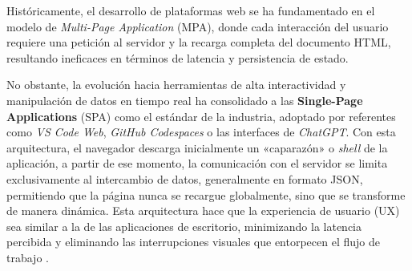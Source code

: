 Históricamente, el desarrollo de plataformas web se ha fundamentado en el modelo de \textit{Multi-Page Application} (MPA), donde cada interacción del usuario requiere una petición al servidor y la recarga completa del documento HTML, resultando ineficaces en términos de latencia y persistencia de estado.

No obstante, la evolución hacia herramientas de alta interactividad y manipulación de datos en tiempo real ha consolidado a las \textbf{Single-Page Applications} (SPA) como el estándar de la industria, adoptado por referentes como \textit{VS Code Web}, \textit{GitHub Codespaces} o las interfaces de \textit{ChatGPT}. Con esta arquitectura, el navegador descarga inicialmente un «caparazón» o \textit{shell} de la aplicación, a partir de ese momento, la comunicación con el servidor se limita exclusivamente al intercambio de datos, generalmente en formato JSON, permitiendo que la página nunca se recargue globalmente, sino que se transforme de manera dinámica. Esta arquitectura hace que la experiencia de usuario (UX) sea similar a la de las aplicaciones de escritorio, minimizando la latencia percibida y eliminando las interrupciones visuales que entorpecen el flujo de trabajo \cite{mikowski2013single}.
